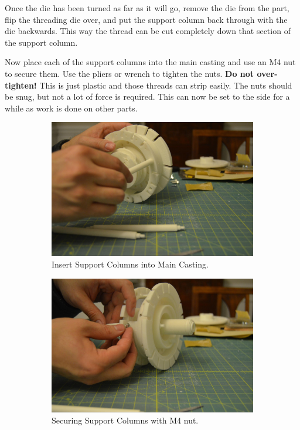 \documentclass[openany]{book}
\begin{document}
Once the die has been turned as far as it will go, remove the die from the part, flip the threading die over, and put the support column back through with the die backwards. This way the thread can be cut completely down that section of the support column.

Now place each of the support columns into the main casting and use an M4 nut to secure them. Use the pliers or wrench to tighten the nuts. \textbf{Do not over-tighten!} This is just plastic and those threads can strip easily. The nuts should be snug, but not a lot of force is required. This can now be set to the side for a while as work is done on other parts.

\begin{figure}[!ht]
	\centering
	\begin{subfigure}{.4\textwidth}
		\centering
		\includegraphics[width=.9\textwidth]{images/image60.jpg}
		\caption{Insert Support Columns into Main Casting.}
		\label{fig:image60}	
	\end{subfigure}
	\begin{subfigure}{.4\textwidth}
		\centering
		\includegraphics[width=.9\textwidth]{images/image37.jpg}
		\caption{Securing Support Columns with M4 nut.}
		\label{fig:image37}	
	\end{subfigure}
	\caption{}
\end{figure}
\end{document}

